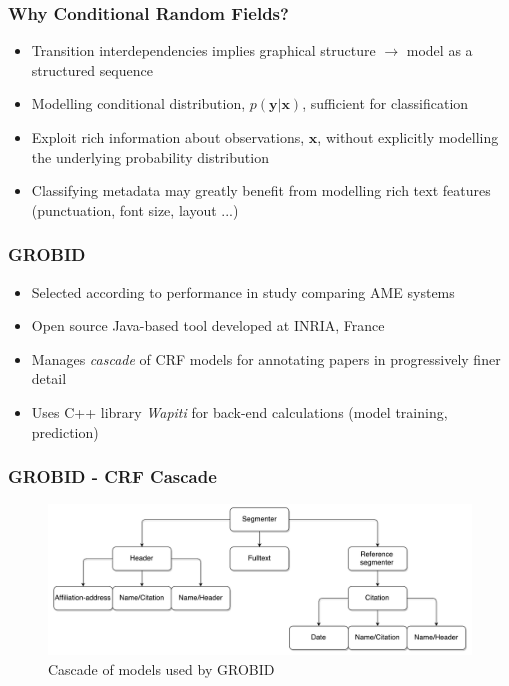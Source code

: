 \documentclass{beamer}
\begin{document}

\begin{frame}
\frametitle{Why Conditional Random Fields?}
\begin{itemize}
\item Transition interdependencies implies graphical structure $\rightarrow$ model as a structured sequence
\item Modelling conditional distribution, $p(\textbf{y}|\textbf{x})$, sufficient for classification
\item Exploit rich information about observations, $\textbf{x}$, without explicitly modelling the underlying probability distribution
\item Classifying metadata may greatly benefit from modelling rich text features (punctuation, font size, layout ...)
\end{itemize}
\end{frame}


\begin{frame}
\frametitle{GROBID}
\begin{itemize}
\item Selected according to performance in study comparing AME systems \cite{
lipinski2013evaluation}
\item Open source Java-based tool developed at INRIA, France
\item Manages \emph{cascade} of CRF models for annotating papers in progressively finer detail
\item Uses C++ library \emph{Wapiti} for back-end calculations (model training, prediction)
\end{itemize}
\end{frame}


\begin{frame}
\frametitle{GROBID - CRF Cascade}
\begin{figure}[h]
\center
\includegraphics[width=\textwidth]{Figures/cascade.pdf}
\caption{Cascade of models used by GROBID}
\end{figure}
\end{frame}
\end{document}
